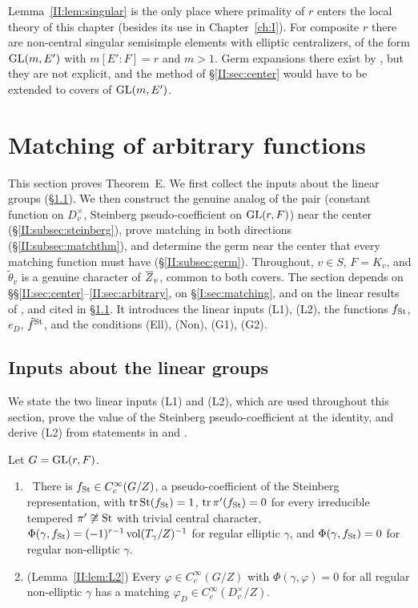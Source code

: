 \begin{remark}
Lemma~\ref{II:lem:singular} is the only place where primality of $r$ enters the local theory of this chapter (besides its use in Chapter~\ref{ch:I}). For composite $r$ there are non-central singular semisimple elements with elliptic centralizers, of the form $\mathrm{GL}(m,E')$ with $m[E':F]=r$ and $m>1$. Germ expansions there exist by \cite[\S8]{FK86}, but they are not explicit, and the method of \S\ref{II:sec:center} would have to be extended to covers of $\mathrm{GL}(m,E')$.
\end{remark}

\section{Matching of arbitrary functions}\label{II:sec:matching}
This section proves Theorem~E. We first collect the inputs about the linear groups (\S\ref{II:subsec:linear}). We then construct the genuine analog of the pair (constant function on $D_v^\times$, Steinberg pseudo-coefficient on $\mathrm{GL}(r,F)$) near the center (\S\ref{II:subsec:steinberg}), prove matching in both directions (\S\ref{II:subsec:matchthm}), and determine the germ near the center that every matching function must have (\S\ref{II:subsec:germ}). Throughout, $v\in S$, $F=K_v$, and $\tilde\theta_v$ is a genuine character of $\overline{Z}_v$, common to both covers. The section depends on \S\S\ref{II:sec:center}--\ref{II:sec:arbitrary}, on \S\ref{I:sec:matching}, and on the linear results of \cite{FK86}, \cite{Kaz86} and \cite{Bad08} cited in \S\ref{II:subsec:linear}. It introduces the linear inputs (L1), (L2), the functions $f_{\mathrm{St}}$, $e_D$, $\tilde f^{\mathrm{St}}$, and the conditions (Ell), (Non), (G1), (G2).

\subsection{Inputs about the linear groups}\label{II:subsec:linear}
We state the two linear inputs (L1) and (L2), which are used throughout this section, prove the value of the Steinberg pseudo-coefficient at the identity, and derive (L2) from statements in \cite{FK86} and \cite{Bad08}.

Let $G=\mathrm{GL}(r,F)$.
\begin{enumerate}[label=(L\arabic*)]
\item \Ev\ There is $f_{\mathrm{St}}\in C_c^\infty(G/Z)$, a pseudo-coefficient of the Steinberg representation, with $\operatorname{tr}\mathrm{St}(f_{\mathrm{St}})=1$, $\operatorname{tr}\pi'(f_{\mathrm{St}})=0$ for every irreducible tempered $\pi'\not\cong\mathrm{St}$ with trivial central character, $\Phi(\gamma,f_{\mathrm{St}})=(-1)^{r-1}\operatorname{vol}(T_\gamma/Z)^{-1}$ for regular elliptic $\gamma$, and $\Phi(\gamma,f_{\mathrm{St}})=0$ for regular non-elliptic $\gamma$.
\item (Lemma~\ref{II:lem:L2}) Every $\varphi\in C_c^\infty(G/Z)$ with $\Phi(\gamma,\varphi)=0$ for all regular non-elliptic $\gamma$ has a matching $\varphi_D\in C_c^\infty(D_v^\times/Z)$.
\end{enumerate}

